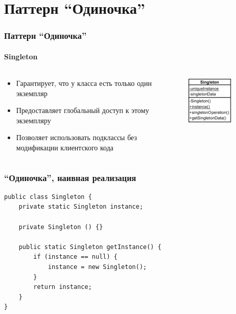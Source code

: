 \documentclass{../../slides-style}
\begin{document}
    \section{Паттерн ``Одиночка''}

    \begin{frame}
        \frametitle{Паттерн ``Одиночка''}
        \framesubtitle{Singleton}
        \begin{columns}
            \begin{column}{0.6\textwidth}
                \begin{itemize}
                    \item Гарантирует, что у класса есть только один экземпляр
                    \item Предоставляет глобальный доступ к этому экземпляру
                    \item Позволяет использовать подклассы без модификации клиентского кода
                \end{itemize}
            \end{column}
            \begin{column}{0.4\textwidth}
                \begin{center}
                    \includegraphics[width=0.6\textwidth]{singleton.png}
                \end{center}
            \end{column}
        \end{columns}
    \end{frame}

    \begin{frame}[fragile]
        \frametitle{``Одиночка'', наивная реализация}
        \begin{verbatim}
public class Singleton {
    private static Singleton instance;

    private Singleton () {}

    public static Singleton getInstance() {
        if (instance == null) {
            instance = new Singleton();
        }
        return instance;
    }
}
        \end{verbatim}
    \end{frame}
\end{document}
